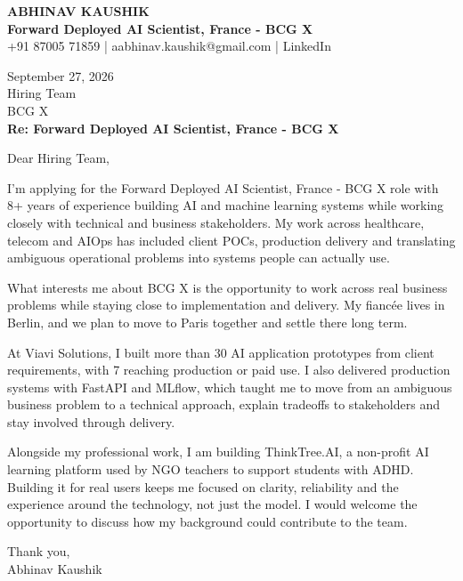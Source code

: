 \documentclass[10pt,a4paper]{article}
\begin{document}
\begin{center}
{\Large\bfseries ABHINAV KAUSHIK}\\[2pt]
{\bfseries Forward Deployed AI Scientist, France - BCG X}\\[2pt]
+91 87005 71859 \quad | \quad aabhinav.kaushik@gmail.com \quad | \quad LinkedIn
\end{center}
\vspace{8pt}
September 27, 2026\\[6pt]
Hiring Team\\
BCG X\\[4pt]
\textbf{Re: Forward Deployed AI Scientist, France - BCG X}

Dear Hiring Team,

I’m applying for the Forward Deployed AI Scientist, France - BCG X role with 8+ years of experience building AI and machine learning systems while working closely with technical and business stakeholders. My work across healthcare, telecom and AIOps has included client POCs, production delivery and translating ambiguous operational problems into systems people can actually use.

What interests me about BCG X is the opportunity to work across real business problems while staying close to implementation and delivery. My fiancée lives in Berlin, and we plan to move to Paris together and settle there long term.

At Viavi Solutions, I built more than 30 AI application prototypes from client requirements, with 7 reaching production or paid use. I also delivered production systems with FastAPI and MLflow, which taught me to move from an ambiguous business problem to a technical approach, explain tradeoffs to stakeholders and stay involved through delivery.

Alongside my professional work, I am building ThinkTree.AI, a non-profit AI learning platform used by NGO teachers to support students with ADHD. Building it for real users keeps me focused on clarity, reliability and the experience around the technology, not just the model. I would welcome the opportunity to discuss how my background could contribute to the team.

Thank you,\\
Abhinav Kaushik
\end{document}
